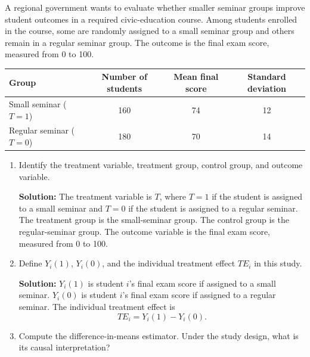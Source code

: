 \documentclass[11pt]{exam}
\begin{document}
\begin{questions}

\question[2.5]
A regional government wants to evaluate whether smaller seminar groups improve student outcomes in a required civic-education course. Among students enrolled in the course, some are randomly assigned to a small seminar group and others remain in a regular seminar group. The outcome is the final exam score, measured from 0 to 100.

\begin{center}
\begin{tabular}{lccc}
\toprule
Group & Number of students & Mean final score & Standard deviation \\
\midrule
Small seminar ($T=1$)   & 160 & 74 & 12 \\
Regular seminar ($T=0$) & 180 & 70 & 14 \\
\bottomrule
\end{tabular}
\end{center}

\begin{enumerate}[leftmargin = 0.5cm, label = (\alph*), rightmargin = 0.2cm]
    \item Identify the treatment variable, treatment group, control group, and outcome variable.

    \begin{solutionorbox}[5.8cm]
    \textbf{Solution:} The treatment variable is $T$, where $T=1$ if the student is assigned to a small seminar and $T=0$ if the student is assigned to a regular seminar. The treatment group is the small-seminar group. The control group is the regular-seminar group. The outcome variable is the final exam score, measured from 0 to 100.
    \end{solutionorbox}

    \item Define $Y_i(1)$, $Y_i(0)$, and the individual treatment effect $TE_i$ in this study.

    \begin{solutionorbox}[6.3cm]
    \textbf{Solution:} $Y_i(1)$ is student $i$'s final exam score if assigned to a small seminar. $Y_i(0)$ is student $i$'s final exam score if assigned to a regular seminar. The individual treatment effect is
    \[
    TE_i=Y_i(1)-Y_i(0).
    \]
    \end{solutionorbox}

    \item Compute the difference-in-means estimator. Under the study design, what is its causal interpretation?


\end{enumerate}
\end{questions}
\end{document}
